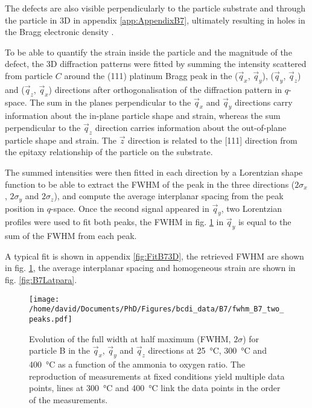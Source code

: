The defects are also visible perpendicularly to the particle substrate and through the particle in 3D in appendix \ref{app:AppendixB7}, ultimately resulting in holes in the Bragg electronic density \parencite{Clark2015, Dupraz2015}.

To be able to quantify the strain inside the particle and the magnitude of the defect, the 3D diffraction patterns were fitted by summing the intensity scattered from particle $C$ around the (111) platinum Bragg peak in the ($\vec{q}_x$, $\vec{q}_y$), ($\vec{q}_y$, $\vec{q}_z$) and ($\vec{q}_z$, $\vec{q}_x$) directions after orthogonalisation of the diffraction pattern in $q$-space.
The sum in the planes perpendicular to the $\vec{q}_x$ and $\vec{q}_y$ directions carry information about the in-plane particle shape and strain, whereas the sum perpendicular to the $\vec{q}_z$ direction carries information about the out-of-plane particle shape and strain.
The $\vec{z}$ direction is related to the [111] direction from the epitaxy relationship of the particle on the substrate.

The summed intensities were then fitted in each direction by a Lorentzian shape function to be able to extract the FWHM of the peak in the three directions ($2\sigma_x$, $2\sigma_y$ and $2\sigma_z$), and compute the average interplanar spacing from the peak position in $q$-space.
Once the second signal appeared in $\vec{q}_y$, two Lorentzian profiles were used to fit both peaks, the FWHM in fig. \ref{fig:B7FWHM} in $\vec{q}_y$ is equal to the sum of the FWHM from each peak.

A typical fit is shown in appendix \ref{fig:FitB73D}, the retrieved FWHM are shown in fig. \ref{fig:B7FWHM}, the average interplanar spacing and homogeneous strain are shown in fig. \ref{fig:B7Latpara}.

\begin{figure}[!htb]
    \centering
    \texttt{[image: /home/david/Documents/PhD/Figures/bcdi\_data/B7/fwhm\_B7\_two\_peaks.pdf]}
    \caption{
        Evolution of the full width at half maximum (FWHM, $2\sigma$) for particle B in the $\vec{q}_x$, $\vec{q}_y$ and $\vec{q}_z$ directions at \qty{25}{\degreeCelsius}, \qty{300}{\degreeCelsius} and \qty{400}{\degreeCelsius} as a function of the ammonia to oxygen ratio.
        The reproduction of measurements at fixed conditions yield multiple data points, lines at \qty{300}{\degreeCelsius} and \qty{400}{\degreeCelsius} link the data points in the order of the measurements.
    }
    \label{fig:B7FWHM}
\end{figure}

